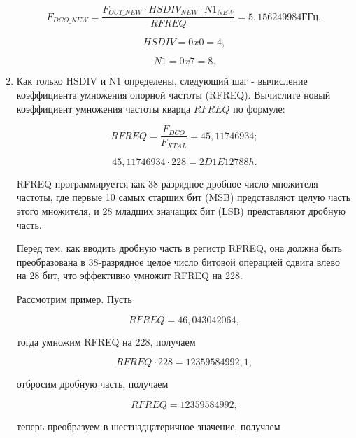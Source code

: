 \documentclass[a4paper,oneside ,14pt]{extreport}
\begin{document}
\begin{enumerate}
	\begin{equation}	
		F_{DCO\_NEW} =  \frac{F_{OUT\_NEW} \cdot HSDIV_{NEW} \cdot N1_{NEW}}{RFREQ} = 5,156249984 ГГц,
	\end{equation}

	\begin{equation}	
		HSDIV = 0x0 = 4,
	\end{equation}
	
	\begin{equation}	
		N1 = 0x7 = 8.
	\end{equation}
	
	\item Как только HSDIV и N1 определены, следующий шаг - вычисление коэффициента умножения опорной частоты (RFREQ). Вычислите новый коэффициент умножения частоты кварца \(RFREQ\) по формуле:

	\begin{equation}	
		RFREQ = \frac{F_{DCO}}{F_{XTAL}} = 45,11746934;
	\end{equation}

	\begin{equation}	
		45,11746934 \cdot 228 = 2D1E12788h.
	\end{equation}

	RFREQ программируется как 38-разрядное дробное число множителя частоты, где первые 10 самых старших бит (MSB) представляют целую часть этого множителя, и 28 младших значащих бит (LSB) представляют дробную часть.

	Перед тем, как вводить дробную часть в регистр RFREQ, она должна быть преобразована в 38-разрядное целое число битовой операцией сдвига влево на 28 бит, что эффективно умножит RFREQ на 228.

	Рассмотрим пример. Пусть 
	
	\begin{equation}	
		RFREQ =  46,043042064,
	\end{equation}

	тогда умножим RFREQ на 228, получаем

	\begin{equation}	
		RFREQ \cdot 228 =  12359584992,1,
	\end{equation}

	отбросим дробную часть, получаем 

	\begin{equation}	
		RFREQ =  12359584992,
	\end{equation}

	теперь преобразуем в шестнадцатеричное значение, получаем


\end{enumerate}
\end{document}
